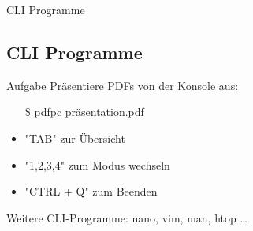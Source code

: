 \begin{frame}{CLI Programme}
    \subsection{CLI Programme}\label{subsec:cli-programme}

    \begin{alertblock}{Aufgabe}
        \pause
        Präsentiere PDFs von der Konsole aus:\pause
        \begin{itemize}
            \item[\$] pdfpc präsentation.pdf\pause
            \item "TAB" zur Übersicht\pause
            \item "1,2,3,4" zum Modus wechseln\pause
            \item "CTRL + Q" zum Beenden
        \end{itemize}
    \end{alertblock}
    \pause

    Weitere CLI-Programme: nano, vim, man, htop \ldots

\end{frame}
